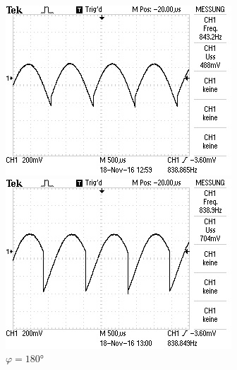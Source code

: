 \begin{figure}[!h]
\begin{minipage}[t]{0.3\textwidth}
\end{minipage}
\hspace{12pt}
\vspace{5pt}
\begin{minipage}[t]{0.3\textwidth}
\includegraphics[width=\textwidth]{Bilder/Rausch270.jpg}
\caption{$\varphi = 180\si{\degree}$}
\label{fig:11}
\end{minipage}
\hspace{12pt}
\vspace{5pt}
\begin{minipage}[t]{0.3\textwidth}
\includegraphics[width=\textwidth]{Bilder/Rausch315.jpg}
\caption{$\varphi = 180\si{\degree}$}
\label{fig:12}
\end{minipage}
\hspace{12pt}
\vspace{5pt}
\end{figure}

